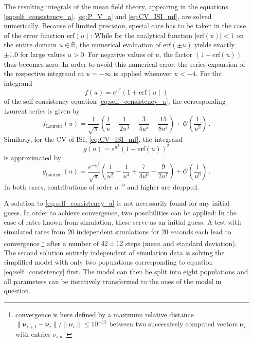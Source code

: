 The resulting integrals of the mean field theory, appearing in the equations 
\eqref{eq:self_consistency_a}, \eqref{eq:P_V_a} and \eqref{eq:CV_ISI_mf}, 
are solved numerically. Because of limited precision, special care has to 
be taken in the case of the error function $\text{erf}(u)$:
While for the analytical 
function $|\text{erf}(u)| < 1$ on the entire domain $u \in \mathbb{R}$, 
the numerical evaluation of 
$\text{erf}(\pm u)$ yields exactly $\pm 1.0$ for large values $u > 0$. 
For negative values of $u$, the factor 
$(1 + \text{erf}(u))$ thus becomes zero.
In order to avoid this numerical error, the series expansion of
the respective integrand at $u = -\infty$ is applied whenever $u < -4$. 
For the integrand 
\begin{equation}
    f(u) = e^{u^2}\left(1 + \text{erf}(u)\right)
    \label{eq:integrand_1}
\end{equation}
of the self consistency equation \eqref{eq:self_consistency_a}, 
the corresponding Laurent series is given by
\begin{equation}
    f_\text{Laurent}(u) = 
        \frac{1}{\sqrt{\pi}} 
        \left( \frac{1}{u} - \frac{1}{2u^3} + \frac{3}{4u^5} - \frac{15}{8u^7} \right) +  
        \mathcal{O}\left( \frac{1}{u^9} \right) \,.
    \label{eq:expand_integrand_1}
\end{equation}
Similarly, for the CV of ISI, \eqref{eq:CV_ISI_mf}, the integrand 
\begin{equation}
    g(u) = e^{u^2}\left(1 + \text{erf}(u)\right)^2
    \label{eq:integrand_2}
\end{equation}
is approximated by
\begin{equation}
    g_\text{Laurent}(u) = 
    \frac{e^{-u^2}}{\sqrt{\pi}} 
        \left( \frac{1}{u^2} - \frac{1}{u^4} + \frac{7}{4u^6} - \frac{9}{2u^7} \right) +  
        \mathcal{O}\left( \frac{1}{u^9} \right) \,.
    \label{eq:expand_integrand_2}
\end{equation}
In both cases, contributions of order $u^{-9}$ and higher are dropped. 

A solution to \eqref{eq:self_consistency_a} is not necessarily found for any initial guess. 
In order to achieve convergence, two possibilities 
can be applied: In the case of rates known from simulation, these serve as an initial guess. 
A test with simulated rates from 20 independent simulations for 20 seconds each lead to convergence%
\footnote{convergence is here defined by a maximum relative distance 
    $\|\boldsymbol\nu_{i + 1} - \boldsymbol\nu_i\| / \|\boldsymbol\nu_i\| \le 10^{-13}$ between two 
    successively computed vectors $\boldsymbol\nu_i$ with entries $\nu_{i, a}$~\cite{scipy}} %
after a number of $42 \pm 12$ steps (mean and standard deviation). 
The second solution entirely independent of simulation data is solving the simplified model 
with only two populations corresponding to equation \eqref{eq:self_consistency} first.
The model can then be split 
into eight populations and all parameters can be iteratively transformed to the ones of the 
model in question. 

